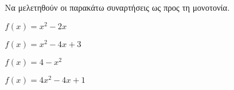 Να μελετηθούν οι παρακάτω συναρτήσεις ως προς τη μονοτονία.
\begin{alist}
\item $ f(x)=x^2-2x $
\item $ f(x)=x^2-4x+3 $
\item $ f(x)=4-x^2 $
\item $ f(x)=4x^2-4x+1 $
\end{alist}
